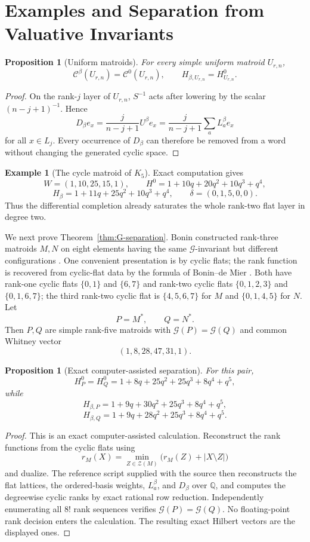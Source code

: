 \documentclass[11pt]{amsart}
\newtheorem{prop}[thm]{Proposition}
\theoremstyle{definition}
\newtheorem{example}[thm]{Example}
\theoremstyle{remark}
\newcommand{\cc}{\mathcal}
\begin{document}
\section{Examples and Separation from Valuative Invariants}\label{sec:examples}

\begin{prop}[Uniform matroids]\label{prop:uniform}
For every simple uniform matroid $U_{r,n}$,
\[
\cc C^\beta(U_{r,n})=\cc C^0(U_{r,n}),
\qquad
H_{\beta,U_{r,n}}=H^0_{U_{r,n}}.
\]
\end{prop}

\begin{proof}
On the rank-$j$ layer of $U_{r,n}$, $S^{-1}$ acts after lowering by the scalar $(n-j+1)^{-1}$.  Hence
\[
D_\beta e_x=\frac{j}{n-j+1}U^\beta e_x
=\frac{j}{n-j+1}\sum_aL_a^\beta e_x
\]
for all $x\in L_j$.
Every occurrence of $D_\beta$ can therefore be removed from a word without changing the generated cyclic space.
\end{proof}

\begin{example}[The cycle matroid of $K_5$]\label{ex:K5}
Exact computation gives
\[
W=(1,10,25,15,1),\qquad
H^0=1+10q+20q^2+10q^3+q^4,
\]
\[
H_\beta=1+11q+25q^2+10q^3+q^4,
\qquad
\delta=(0,1,5,0,0).
\]
Thus the differential completion already saturates the whole rank-two flat layer in degree two.
\end{example}

We next prove Theorem~\ref{thm:G-separation}.  Bonin constructed rank-three matroids $M,N$ on eight elements having the same $\mathcal G$-invariant but different configurations \cite{BoninG}.  One convenient presentation is by cyclic flats; the rank function is recovered from cyclic-flat data by the formula of Bonin--de Mier \cite{BoninDeMier}.  Both have rank-one cyclic flats $\{0,1\}$ and $\{6,7\}$ and rank-two cyclic flats $\{0,1,2,3\}$ and $\{0,1,6,7\}$; the third rank-two cyclic flat is $\{4,5,6,7\}$ for $M$ and $\{0,1,4,5\}$ for $N$.  Let
\[
P=M^*,\qquad Q=N^*.
\]
Then $P,Q$ are simple rank-five matroids with $\mathcal G(P)=\mathcal G(Q)$ and common Whitney vector
\[
(1,8,28,47,31,1).
\]

\begin{prop}[Exact computer-assisted separation]\label{prop:Bonin}
For this pair,
\[
H_P^0=H_Q^0=1+8q+25q^2+25q^3+8q^4+q^5,
\]
while
\[
H_{\beta,P}=1+9q+30q^2+25q^3+8q^4+q^5,
\]
\[
H_{\beta,Q}=1+9q+28q^2+25q^3+8q^4+q^5.
\]
\end{prop}

\begin{proof}
This is an exact computer-assisted calculation.  Reconstruct the rank functions from the cyclic flats using
\[
r_M(X)=\min_{Z\in\mathcal Z(M)}\bigl(r_M(Z)+|X\setminus Z|\bigr)
\]
and dualize.  The reference script supplied with the source then reconstructs the flat lattices, the ordered-basis weights, $L_a^\beta$, and $D_\beta$ over $\mathbb Q$, and computes the degreewise cyclic ranks by exact rational row reduction.  Independently enumerating all $8!$ rank sequences verifies $\mathcal G(P)=\mathcal G(Q)$.  No floating-point rank decision enters the calculation.  The resulting exact Hilbert vectors are the displayed ones.
\end{proof}
\end{document}
